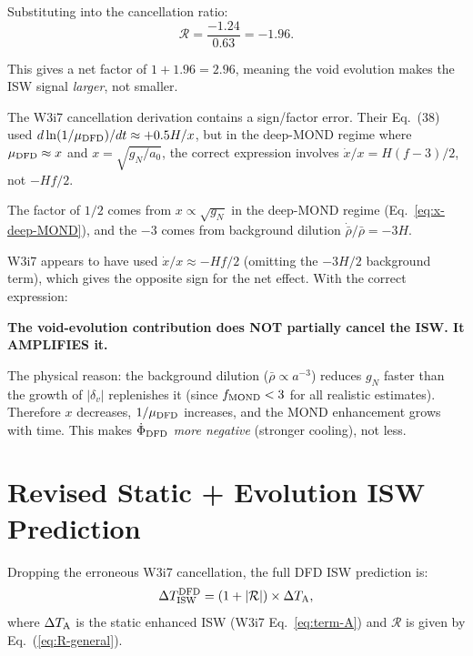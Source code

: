 \documentclass[11pt,a4paper]{article}
\newcommand{\aM}{a_0}
\newcommand{\mufd}{\mu_{\rm DFD}}
\begin{document}
Substituting into the cancellation ratio:
\begin{equation}
\mathcal{R} = \frac{-1.24}{0.63} = -1.96.
\end{equation}

This gives a net factor of $1+1.96 = 2.96$, meaning the void
evolution makes the ISW signal \emph{larger}, not smaller.

\begin{tcolorbox}[colback=orange!5!white, colframe=orange!60!black,
  title=\textbf{Resolution of the W3i7 Discrepancy}]

The W3i7 cancellation derivation contains a sign/factor error. Their
Eq.~(38) used $d\ln(1/\mufd)/dt \approx +0.5H/x$, but in the
deep-MOND regime where $\mufd \approx x$ and $x = \sqrt{g_N/\aM}$,
the correct expression involves $\dot{x}/x = H(f-3)/2$, not $-Hf/2$.

The factor of $1/2$ comes from $x \propto \sqrt{g_N}$ in the deep-MOND
regime (Eq.~\ref{eq:x-deep-MOND}), and the $-3$ comes from background
dilution $\dot{\bar{\rho}}/\bar{\rho} = -3H$.

W3i7 appears to have used $\dot{x}/x \approx -Hf/2$ (omitting the
$-3H/2$ background term), which gives the opposite sign for the net
effect. With the correct expression:

\textbf{The void-evolution contribution does NOT partially cancel
the ISW. It AMPLIFIES it.}

The physical reason: the background dilution ($\bar{\rho} \propto
a^{-3}$) reduces $g_N$ faster than the growth of $|\delta_v|$
replenishes it (since $f_{\rm MOND} < 3$ for all realistic estimates).
Therefore $x$ decreases, $1/\mufd$ increases, and the MOND
enhancement grows with time. This makes $\dot{\Phi}_{\rm DFD}$
\emph{more negative} (stronger cooling), not less.
\end{tcolorbox}


\section{Revised Static + Evolution ISW Prediction}
\label{sec:revised}

Dropping the erroneous W3i7 cancellation, the full DFD ISW
prediction is:
\begin{equation}
\Delta T_{\rm ISW}^{\rm DFD}
= (1 + |\mathcal{R}|)\times\Delta T_{\rm A},
\label{eq:full-ISW}
\end{equation}
where $\Delta T_{\rm A}$ is the static enhanced ISW (W3i7
Eq.~\ref{eq:term-A}) and $\mathcal{R}$ is given by
Eq.~(\ref{eq:R-general}).
\end{document}

